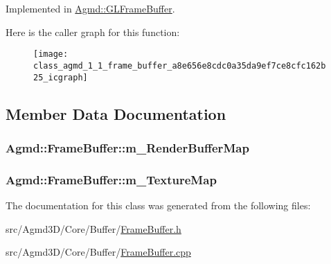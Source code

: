 Implemented in \hyperlink{class_agmd_1_1_g_l_frame_buffer_a5f2c641f2eee6774075b27ebaaca5116}{Agmd\+::\+G\+L\+Frame\+Buffer}.



Here is the caller graph for this function\+:\nopagebreak
\begin{figure}[H]
\begin{center}
\leavevmode
\texttt{[image: class\_agmd\_1\_1\_frame\_buffer\_a8e656e8cdc0a35da9ef7ce8cfc162b25\_icgraph]}
\end{center}
\end{figure}




\subsection{Member Data Documentation}
\hypertarget{class_agmd_1_1_frame_buffer_aae5914f57aa6d790bd89df6e016b2f04}{
\subsubsection[{m\+\_\+\+Render\+Buffer\+Map}]{ Agmd\+::\+Frame\+Buffer\+::m\+\_\+\+Render\+Buffer\+Map\hspace{0.3cm}{\ttfamily [protected]}}}\label{class_agmd_1_1_frame_buffer_aae5914f57aa6d790bd89df6e016b2f04}
\hypertarget{class_agmd_1_1_frame_buffer_a5a14e4858f1ddf4b213ec903d90b35ef}{
\subsubsection[{m\+\_\+\+Texture\+Map}]{ Agmd\+::\+Frame\+Buffer\+::m\+\_\+\+Texture\+Map\hspace{0.3cm}{\ttfamily [protected]}}}\label{class_agmd_1_1_frame_buffer_a5a14e4858f1ddf4b213ec903d90b35ef}


The documentation for this class was generated from the following files\+:\begin{DoxyCompactItemize}
\item 
src/\+Agmd3\+D/\+Core/\+Buffer/\hyperlink{_frame_buffer_8h}{Frame\+Buffer.\+h}\item 
src/\+Agmd3\+D/\+Core/\+Buffer/\hyperlink{_frame_buffer_8cpp}{Frame\+Buffer.\+cpp}\end{DoxyCompactItemize}

